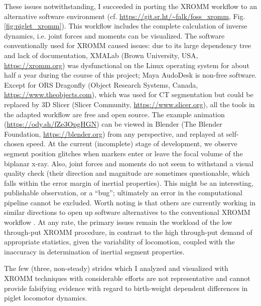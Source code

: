 These issues notwithstanding, I succeeded in porting the XROMM workflow \citep{Brainerd2010} to an alternative software environment (cf. \url{https://git.sr.ht/\~falk/foss\_xromm}, Fig. \ref{fig:piglet_xromm}).
This workflow includes the complete calculation of inverse dynamics, i.e. joint forces and moments can be visualized.
The software conventionally used for XROMM caused issues: due to its large dependency tree and lack of documentation, XMALab (Brown University, USA, \url{https://xromm.org}) was dysfunctional on the Linux operating system for about half a year during the course of this project; Maya AudoDesk is non-free software.
Except for ORS Dragonfly (Object Research Systems, Canada, \url{https://www.theobjects.com}), which was used for CT segmentation but could be replaced by 3D Slicer (Slicer Community, \url{https://www.slicer.org}), all the tools in the adapted workflow are free and open source.
The example animation (\url{https://ody.sh/fZe3OpgHGN}) can be viewed in Blender (The Blender Foundation, \url{https://blender.org}) from any perspective, and replayed at self-chosen speed.
At the current (incomplete) stage of development, we observe segment position glitches when markers enter or leave the focal volume of the biplanar x-ray.
Also, joint forces and moments do not seem to withstand a visual quality check (their direction and magnitude are sometimes questionable, which falls within the error margin of inertial properties).
This might be an interesting, publishable observation, or a ``bug''; ultimately an error in the computational pipeline cannot be excluded.
Worth noting is that others are currently working in similar directions to open up software alternatives to the conventional XROMM workflow \citep{Falkingham2023}.
At any rate, the primary issues remain the workload of the low through-put XROMM procedure, in contrast to the high through-put demand of appropriate statistics, given the variability of locomotion, coupled with the inaccuracy in determination of inertial segment properties.

The few (three, non-steady) strides which I analyzed and visualized with XROMM techniques with considerable efforts are not representative and cannot provide falsifying evidence with regard to birth-weight dependent differences in piglet locomotor dynamics.


